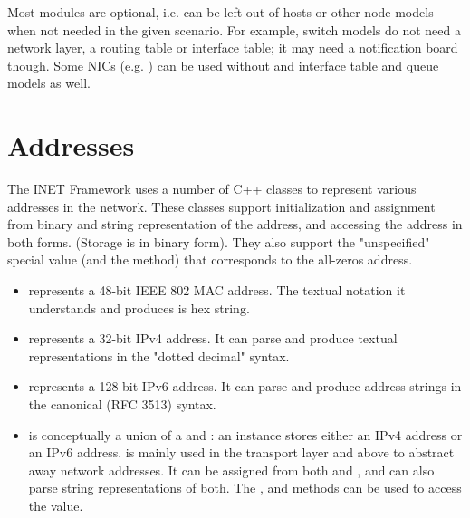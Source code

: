 Most modules are optional, i.e. can be left out of hosts or other node
models when not needed in the given scenario. For example, switch models do
not need a network layer, a routing table or interface table; it may need a
notification board though. Some NICs (e.g. ) can be used
without and interface table and queue models as well.

\iffalse TODO
The notification board (\nedtype{NotificationBoard}) and the interface
table (\nedtype{InterfaceTable}) will be described later in this chapter.
Other modules are covered in later chapters, i.e. \nedtype{RoutingTable}
in the IPv4 chapter.
\fi

\section{Addresses}

The INET Framework uses a number of C++ classes to represent various
addresses in the network. These classes support initialization and
assignment from binary and string representation of the address, and
accessing the address in both forms. (Storage is in binary form). They also
support the "unspecified" special value (and the 
method) that corresponds to the all-zeros address.

\begin{itemize}
  \item {} represents a 48-bit IEEE 802 MAC address. The
    textual notation it understands and produces is hex string.

  \item {} represents a 32-bit IPv4 address. It can parse
    and produce textual representations in the "dotted decimal" syntax.

  \item {} represents a 128-bit IPv6 address. It can parse
    and produce address strings in the canonical (RFC 3513) syntax.

  \item {} is conceptually a union of a 
    and : an instance stores either an IPv4 address or an
    IPv6 address.  is mainly used in the transport layer and above
    to abstract away network addresses. It can be assigned from both 
    and , and can also parse string representations of both.
    The ,  and  methods can be used
    to access the value.
\end{itemize}

